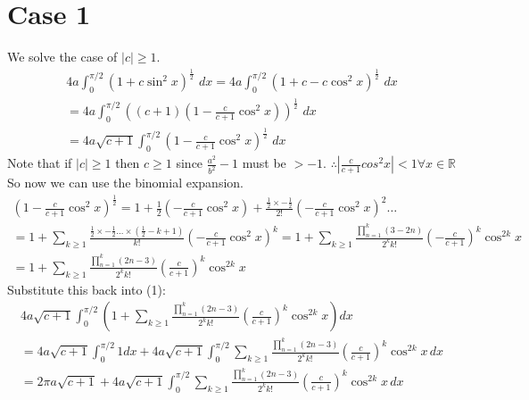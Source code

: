 \documentclass{article}
\begin{document}
\section{Case 1}
We solve the case of $|c| \geq 1$.
\begin{equation}
\begin{split}
	4a\int_{0}^{\pi/2}(1 + c\sin^2x)^\frac{1}{2}\,\,dx
	= 4a\int_{0}^{\pi/2}(1 + c - c\cos^2x)^\frac{1}{2}\,\,dx\\
	= 4a\int_{0}^{\pi/2}\left((c+1)(1 - \frac{c}{c+1}\cos^2x)\right)^\frac{1}{2}\,\,dx\\
	= 4a\sqrt{c+1}\int_{0}^{\pi/2}(1 - \frac{c}{c+1}\cos^2x)^\frac{1}{2}\,\,dx
\end{split}
\end{equation}
Note that if $|c|\geq 1$ then $c\geq 1$ since $\frac{a^2}{b^2} - 1$ must be $>-1$. $\therefore |\frac{c}{c+1}cos^2x|<1\forall x \in \mathbb{R}$\\
So now we can use the binomial expansion.
\begin{equation*}
\begin{split}
	\left(1 - \frac{c}{c+1}\cos^2x\right)^\frac{1}{2}
	= 1 + \frac{1}{2}\left(-\frac{c}{c+1}\cos^2x\right) + \frac{\frac{1}{2}\times-\frac{1}{2}}{2!}\left(-\frac{c}{c+1}\cos^2x\right)^2 \dots\\
	= 1 + \sum_{k\geq 1} \frac{\frac{1}{2}\times-\frac{1}{2}\dots\times(\frac{1}{2}-k+1)}{k!}\left(-\frac{c}{c+1}\cos^2x\right)^k
	= 1 + \sum_{k\geq 1} \frac{\prod_{n=1}^{k}(3-2n)}{2^kk!}\left(-\frac{c}{c+1}\right)^k\cos^{2k}x\\
	= 1 + \sum_{k\geq 1} \frac{\prod_{n=1}^{k}(2n-3)}{2^kk!}\left(\frac{c}{c+1}\right)^k\cos^{2k}x
\end{split}
\end{equation*}
Substitute this back into (1):
\begin{equation*}
\begin{split}
	4a\sqrt{c+1}\int_{0}^{\pi/2}\left(
	1 + \sum_{k\geq 1} \frac{\prod_{n=1}^{k}(2n-3)}{2^kk!}\left(\frac{c}{c+1}\right)^k\cos^{2k}x
	\right)dx\\
	= 4a\sqrt{c+1}\int_{0}^{\pi/2}1dx + 
	4a\sqrt{c+1}\int_{0}^{\pi/2}\sum_{k\geq 1} \frac{\prod_{n=1}^{k}(2n-3)}{2^kk!}\left(\frac{c}{c+1}\right)^k\cos^{2k}x\,dx\\
	= 2\pi a\sqrt{c+1} + 4a\sqrt{c+1}\int_{0}^{\pi/2}\sum_{k\geq 1} \frac{\prod_{n=1}^{k}(2n-3)}{2^kk!}\left(\frac{c}{c+1}\right)^k\cos^{2k}x\,dx\\
\end{split}
\end{equation*}
\end{document}
